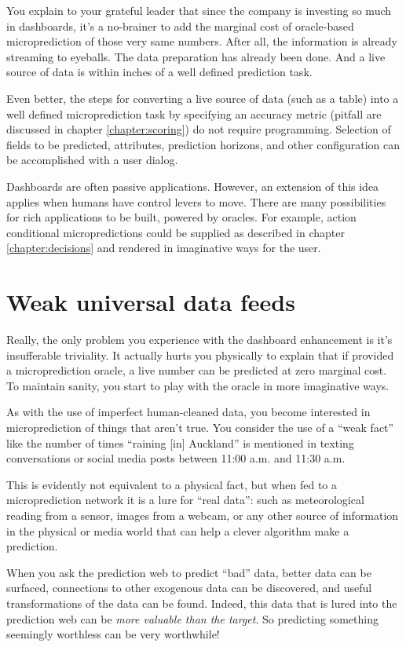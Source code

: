 You explain to your grateful leader that since the company is investing so much in dashboards, it's a no-brainer to add the marginal cost of oracle-based microprediction of those very same numbers. After all, the information is already streaming to eyeballs. The data preparation has already been done. And a live source of data is within inches of a well defined prediction task.

Even better, the steps for converting a live source of data (such as a table) into a well defined microprediction task by specifying an accuracy metric (pitfall are discussed in chapter  \ref{chapter:scoring}) do not require programming. Selection of fields to be predicted, attributes, prediction horizons, and other configuration can be accomplished with a user dialog. 

Dashboards are often passive applications. However, an extension of this idea applies when humans have control levers to move. There are many possibilities for rich applications to be built, powered by oracles. For example, action conditional micropredictions could be supplied as described in chapter \ref{chapter:decisions} and rendered in imaginative ways for the user.  


\section{Weak universal data feeds}
\label{sec:universal}

Really, the only problem you experience with the dashboard enhancement is it's insufferable triviality. It actually hurts you physically to explain that if provided a microprediction oracle, a live number can be predicted at zero marginal cost. To maintain sanity, you start to play with the oracle in more imaginative ways. 


As with the use of imperfect human-cleaned data, you become interested in microprediction of things that aren't true. You consider the use of a ``weak fact'' like the number of times ``raining [in] Auckland'' is mentioned in texting conversations or social media posts between 11:00 a.m. and 11:30 a.m. 

This is evidently not equivalent to a physical fact, but when fed to a microprediction network it is a lure for ``real data'': such as meteorological reading from a sensor, images from a webcam, or any other source of information in the physical or media world that can help a clever algorithm make a prediction.  


When you ask the prediction web to predict ``bad'' data, better data can be surfaced, connections to other exogenous data can be discovered, and useful transformations of the data can be found. Indeed, this data that is lured into the prediction web can be {\em more valuable than the target}. So predicting something seemingly worthless can be very worthwhile! 

